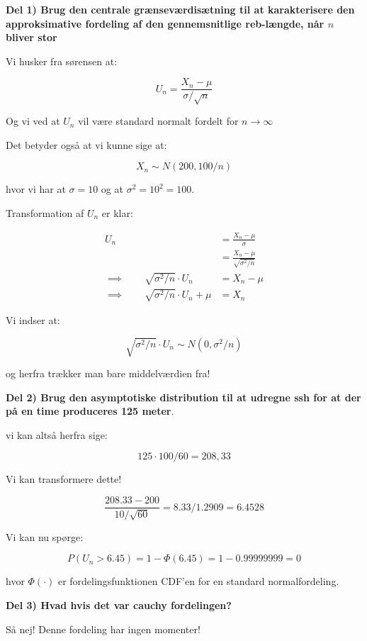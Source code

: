 \textbf{Del 1) Brug den centrale grænseværdisætning til at karakterisere den approksimative fordeling af den gennemsnitlige reb-længde, når $n$ bliver stor}

Vi husker fra sørensen at:

\begin{equation}
    U_n = \frac{X_n - \mu}{\sigma / \sqrt{n}}
\end{equation}

Og vi ved at $U_n$ vil være standard normalt fordelt for $n \rightarrow \infty$

Det betyder også at vi kunne sige at:

\begin{equation}
    X_n \sim N(200, 100 / n)
\end{equation}

hvor vi har at $\sigma = 10$ og at $\sigma^2 = 10^2 = 100$.

Transformation af $U_n$ er klar:

\begin{align}
    U_n
    &= \frac{X_n - \mu}{\sigma} \\
    &= \frac{X_n - \mu}{\sqrt{\sigma^2 / n}} \\
    \implies \qquad \sqrt{\sigma^2 / n} \cdot U_n &= X_n - \mu \\
    \implies \qquad \sqrt{\sigma^2 / n} \cdot  U_n  + \mu &= X_n
\end{align}

Vi indser at:

\begin{equation}
    \sqrt{\sigma^2 / n} \cdot U_n \sim N(0, \sigma^2 / n)
\end{equation}

og herfra trækker man bare middelværdien fra!

\textbf{Del 2) Brug den asymptotiske distribution til at udregne ssh for at der på en time produceres 125 meter}.

vi kan altså herfra sige:

\begin{equation}
    125 \cdot 100 / 60 = 208,33
\end{equation}

Vi kan transformere dette!

\begin{equation}
    \frac{208.33 - 200}{10 / \sqrt{60}} = 8.33 / 1.2909 = 6.4528
\end{equation}

Vi kan nu spørge:

\begin{equation}
    P(U_n > 6.45) = 1 - \Phi(6.45) = 1 - 0.99999999 = 0
\end{equation}

hvor $\Phi(\cdot)$ er fordelingsfunktionen CDF'en for en standard normalfordeling.

\textbf{Del 3) Hvad hvis det var cauchy fordelingen?}

Så nej! Denne fordeling har ingen momenter!


